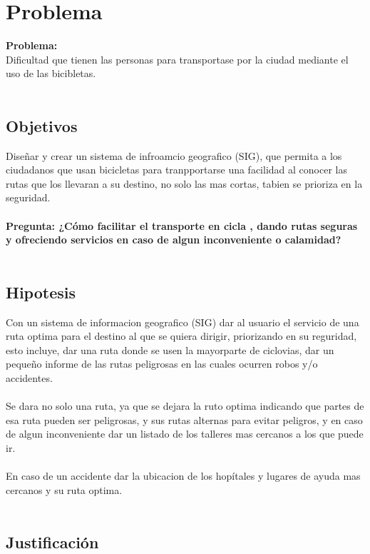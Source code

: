 \chapter{Problema}


\textbf{Problema:}
\\
Dificultad que tienen las personas para transportase por la ciudad mediante el uso de las bicibletas.
\\
\\
\section{Objetivos}

Diseñar y crear un sistema de infroamcio geografico (SIG), que permita a los ciudadanos que usan bicicletas para tranpportarse una facilidad al conocer las rutas que los llevaran a su destino, no solo las mas cortas, tabien se prioriza en la seguridad.
\\
\\
\textbf{Pregunta: ¿Cómo facilitar el transporte en cicla , dando rutas seguras y ofreciendo servicios en caso de algun inconveniente o calamidad?}
\\
\\
\section{Hipotesis}

Con un sistema de informacion geografico (SIG) dar al usuario el servicio de una ruta optima para el destino al que se quiera dirigir, priorizando en su reguridad, esto incluye, dar una ruta donde se usen la mayorparte de ciclovias, dar un pequeño informe de las rutas peligrosas en las cuales ocurren robos y/o accidentes.
\\
\\
Se dara no solo una ruta, ya que se dejara la ruto optima indicando que partes de esa ruta pueden ser peligrosas, y sus rutas alternas para evitar peligros, y en caso de algun inconveniente dar un listado de los talleres mas cercanos a los que puede ir.\\
\\
En caso de un accidente dar la ubicacion de los hopítales y lugares de ayuda mas cercanos y su ruta optima.
\\
\\
\vfill
\section{Justificación}

